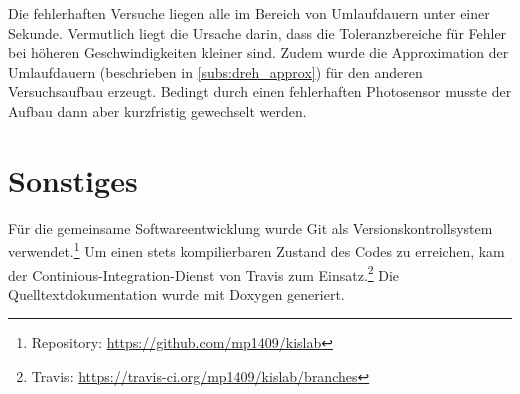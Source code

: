 Die fehlerhaften Versuche liegen alle im Bereich von Umlaufdauern unter einer Sekunde.
Vermutlich liegt die Ursache darin, dass die Toleranzbereiche für Fehler bei höheren Geschwindigkeiten kleiner sind.
Zudem wurde die Approximation der Umlaufdauern (beschrieben in \cref{subs:dreh_approx}) für den anderen Versuchsaufbau erzeugt.
Bedingt durch einen fehlerhaften Photosensor musste der Aufbau dann aber kurzfristig gewechselt werden.

\section{Sonstiges}
Für die gemeinsame Softwareentwicklung wurde Git als Versionskontrollsystem verwendet.\footnote{Repository: \url{https://github.com/mp1409/kislab}}
Um einen stets kompilierbaren Zustand des Codes zu erreichen, kam der Continious-Integration-Dienst von Travis zum Einsatz.\footnote{Travis: \url{https://travis-ci.org/mp1409/kislab/branches}}
Die Quelltextdokumentation wurde mit Doxygen generiert.
